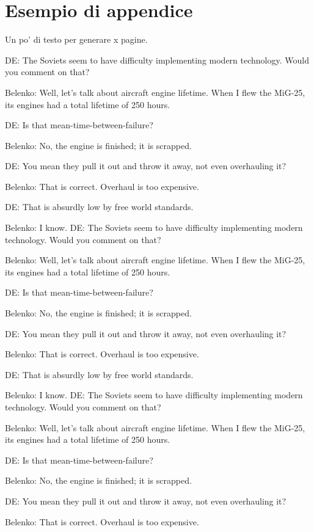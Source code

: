 \chapter{Esempio di appendice}


Un po' di testo per generare x pagine.


DE:  The Soviets seem to have difficulty implementing modern technology.
     Would you comment on that?

Belenko:  Well, let's talk about aircraft engine lifetime.  When I flew the
          MiG-25, its engines had a total lifetime of 250 hours.

DE:  Is that mean-time-between-failure?

Belenko:  No, the engine is finished; it is scrapped.

DE:  You mean they pull it out and throw it away, not even overhauling it?

Belenko:  That is correct.  Overhaul is too expensive.

DE:  That is absurdly low by free world standards.

Belenko:  I know.
DE:  The Soviets seem to have difficulty implementing modern technology.
     Would you comment on that?

Belenko:  Well, let's talk about aircraft engine lifetime.  When I flew the
          MiG-25, its engines had a total lifetime of 250 hours.

DE:  Is that mean-time-between-failure?

Belenko:  No, the engine is finished; it is scrapped.

DE:  You mean they pull it out and throw it away, not even overhauling it?

Belenko:  That is correct.  Overhaul is too expensive.

DE:  That is absurdly low by free world standards.

Belenko:  I know.
DE:  The Soviets seem to have difficulty implementing modern technology.
     Would you comment on that?

Belenko:  Well, let's talk about aircraft engine lifetime.  When I flew the
          MiG-25, its engines had a total lifetime of 250 hours.

DE:  Is that mean-time-between-failure?

Belenko:  No, the engine is finished; it is scrapped.

DE:  You mean they pull it out and throw it away, not even overhauling it?

Belenko:  That is correct.  Overhaul is too expensive.

